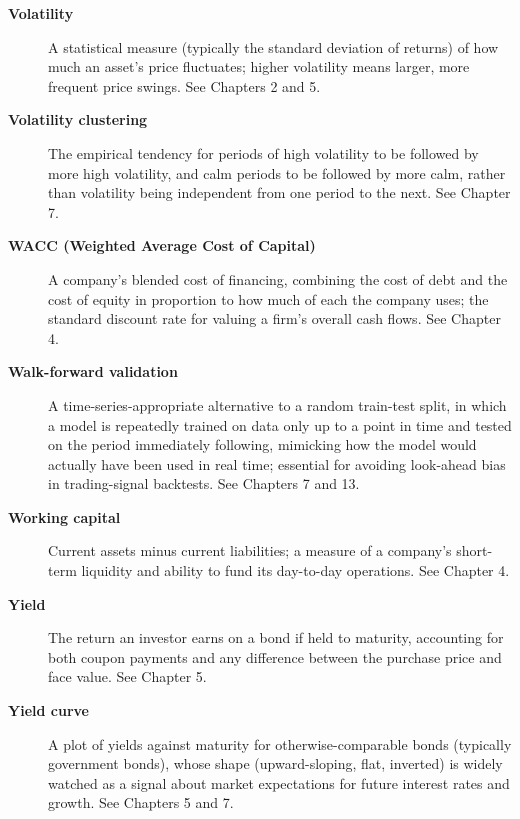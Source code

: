 \documentclass[../ai_in_finance]{subfiles}
\begin{document}
\begin{description}
\item[\textbf{Volatility}] A statistical measure (typically the standard deviation of returns) of how much an asset's price fluctuates; higher volatility means larger, more frequent price swings. See Chapters 2 and 5.

\item[\textbf{Volatility clustering}] The empirical tendency for periods of high volatility to be followed by more high volatility, and calm periods to be followed by more calm, rather than volatility being independent from one period to the next. See Chapter 7.

\item[\textbf{WACC (Weighted Average Cost of Capital)}] A company's blended cost of financing, combining the cost of debt and the cost of equity in proportion to how much of each the company uses; the standard discount rate for valuing a firm's overall cash flows. See Chapter 4.

\item[\textbf{Walk-forward validation}] A time-series-appropriate alternative to a random train-test split, in which a model is repeatedly trained on data only up to a point in time and tested on the period immediately following, mimicking how the model would actually have been used in real time; essential for avoiding look-ahead bias in trading-signal backtests. See Chapters 7 and 13.

\item[\textbf{Working capital}] Current assets minus current liabilities; a measure of a company's short-term liquidity and ability to fund its day-to-day operations. See Chapter 4.

\item[\textbf{Yield}] The return an investor earns on a bond if held to maturity, accounting for both coupon payments and any difference between the purchase price and face value. See Chapter 5.

\item[\textbf{Yield curve}] A plot of yields against maturity for otherwise-comparable bonds (typically government bonds), whose shape (upward-sloping, flat, inverted) is widely watched as a signal about market expectations for future interest rates and growth. See Chapters 5 and 7.

\end{description}
\end{document}
